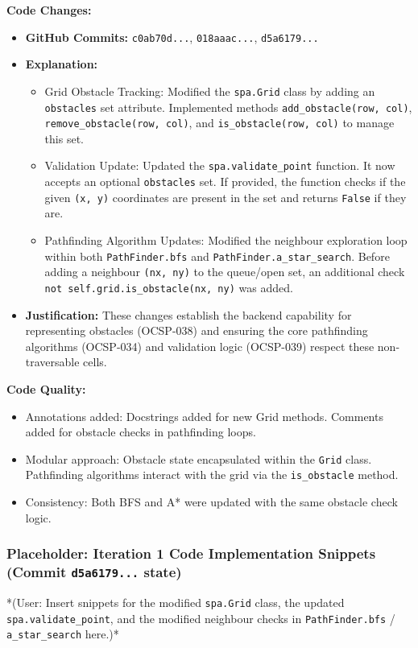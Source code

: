 \textbf{Code Changes:}
\begin{itemize}
	\item \textbf{GitHub Commits:} \verb|c0ab70d...|, \verb|018aaac...|, \verb|d5a6179...|
	\item \textbf{Explanation:}
	\begin{itemize}
	    \item Grid Obstacle Tracking: Modified the \verb|spa.Grid| class by adding an \verb|obstacles| set attribute. Implemented methods \verb|add_obstacle(row, col)|, \verb|remove_obstacle(row, col)|, and \verb|is_obstacle(row, col)| to manage this set.
	    \item Validation Update: Updated the \verb|spa.validate_point| function. It now accepts an optional \verb|obstacles| set. If provided, the function checks if the given \verb|(x, y)| coordinates are present in the set and returns \verb|False| if they are.
		\item Pathfinding Algorithm Updates: Modified the neighbour exploration loop within both \verb|PathFinder.bfs| and \verb|PathFinder.a_star_search|. Before adding a neighbour \verb|(nx, ny)| to the queue/open set, an additional check \verb|not self.grid.is_obstacle(nx, ny)| was added.
	\end{itemize}
	\item \textbf{Justification:} These changes establish the backend capability for representing obstacles (OCSP-038) and ensuring the core pathfinding algorithms (OCSP-034) and validation logic (OCSP-039) respect these non-traversable cells.
\end{itemize}

\textbf{Code Quality:}
\begin{itemize}
	\item Annotations added: Docstrings added for new Grid methods. Comments added for obstacle checks in pathfinding loops.
	\item Modular approach: Obstacle state encapsulated within the \verb|Grid| class. Pathfinding algorithms interact with the grid via the \verb|is_obstacle| method.
	\item Consistency: Both BFS and A* were updated with the same obstacle check logic.
\end{itemize}

\subsubsection*{Placeholder: Iteration 1 Code Implementation Snippets (Commit \verb|d5a6179...| state)}
*(User: Insert snippets for the modified \verb|spa.Grid| class, the updated \verb|spa.validate_point|, and the modified neighbour checks in \verb|PathFinder.bfs| / \verb|a_star_search| here.)*

